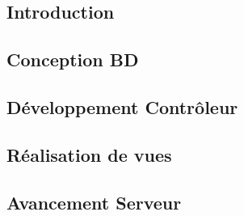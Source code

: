 

\subsection{Introduction}


\subsection{Conception BD}


\subsection{Développement Contrôleur}


\subsection{Réalisation de vues}


\subsection{Avancement Serveur}

